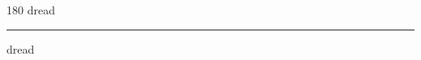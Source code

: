 
\begin{frame}
\begin{center}
\begin{turn}{180}
{\fontsize{2.5cm}{1em}\selectfont dread}
\end{turn}
\vspace{1em}\par  
\hrule
\vspace{1em}\par  
{\fontsize{2.5cm}{1em}\selectfont dread}
\end{center}
\end{frame}
